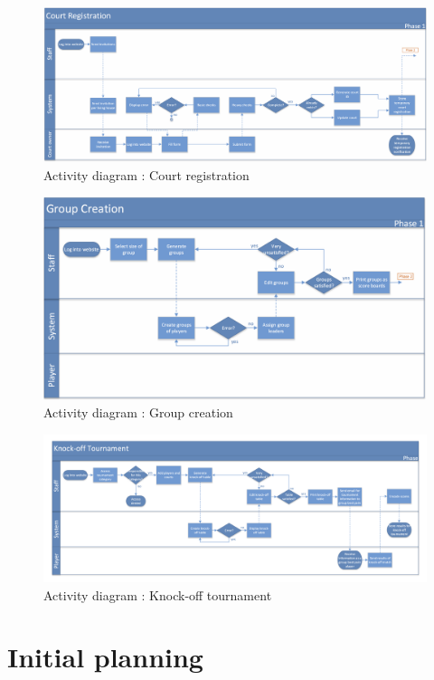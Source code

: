 \begin{figure}[!ht]
    \centering
    \includegraphics[width=0.9\linewidth]{res/Activity-diagram-CR-02-v2.png}
    \caption{Activity diagram : Court registration}
\end{figure}

\begin{figure}[!ht]
	\centering
     \includegraphics[width=0.85\linewidth]{res/Activity-diagram-GC-03-v2.png}
     \caption{Activity diagram : Group creation}
\end{figure}

\begin{figure}[!ht]
	\centering
    \includegraphics[width=0.85\linewidth]{res/Activity-diagram-KT-04-v2.png}
    \caption{Activity diagram : Knock-off tournament}
\end{figure}
\FloatBarrier

\restoregeometry

\section{Initial planning}

